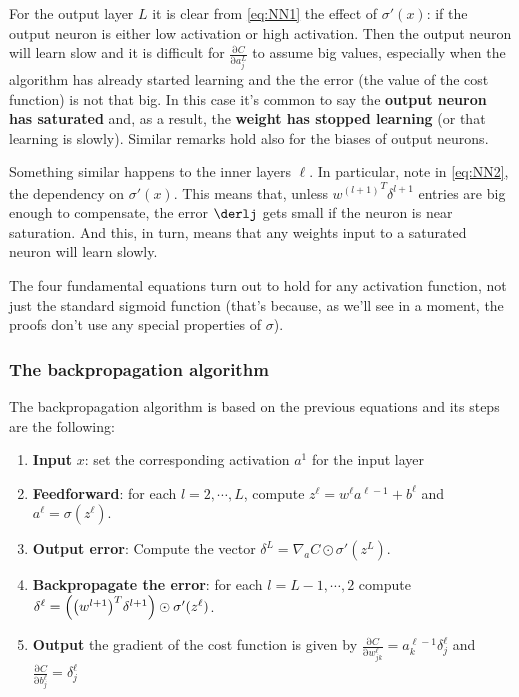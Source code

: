 \documentclass[12pt, letterpaper]{article}
\theoremstyle{definition}
\DeclarePairedDelimiter\autobracket{(}{)}
\newcommand{\br}[1]{\autobracket*{#1}}
\newcommand{\pr}{\mathrm{\partial}}
\let\tb\textbf
\begin{document}
For the output layer $L$ it is clear from \autoref{eq:NN1} the effect of $\sigma'(x)$: if the output neuron is either low activation or high activation. Then the output neuron will learn slow and it is difficult for $\frac{\pr C}{\pr a_j^L}$ to assume big values, especially when the algorithm has already started learning and the the error (the value of the cost function) is not that big. In this case it's common to say the \tb{output neuron has saturated} and, as a result, the \tb{weight has stopped learning} (or that learning is slowly). Similar remarks hold also for the biases of output neurons.

Something similar happens to the inner layers $\ell$. In particular, note in \autoref{eq:NN2}, the dependency on $\sigma'(x)$. This means that, unless ${w^{(l+1)}}^T \delta^{l+1}$ entries are big enough to compensate, the error $\derlj$ gets small if the neuron is near saturation. And this, in turn, means that any weights input to a saturated neuron will learn slowly.

The four fundamental equations turn out to hold for any activation function, not just the standard sigmoid function (that's because, as we'll see in a moment, the proofs don't use any special properties of $\sigma$).

\subsubsection{The backpropagation algorithm}
The backpropagation algorithm is based on the previous equations and its steps are the following:
\begin{enumerate}
\item \tb{Input} $x$: set the corresponding activation $a^1$ for the input layer
\item \tb{Feedforward}: for each $l=2,\cdots, L$, compute $z^\ell = w^\ell a^{\ell-1} +b^\ell$ and $a^\ell = \sigma(z^\ell)$.
\item \tb{Output error}: Compute the vector $\delta^L= \nabla_a C \odot \sigma'(z^L)$.
\item \tb{Backpropagate the error}: for each $l=L-1, \cdots, 2$ compute $\delta^\ell=\br{\br{w^{l+1}}^T\delta^{l+1}}\odot \sigma'(z^\ell)$.
\item \tb{Output} the gradient of the cost function is given by $\frac{\pr C}{\pr w_{jk}^\ell}=a_k^{\ell-1}\delta_j^\ell$ and $\frac{\pr C}{\pr b_{j}^\ell} = \delta_j^\ell$
\end{enumerate}
\end{document}
